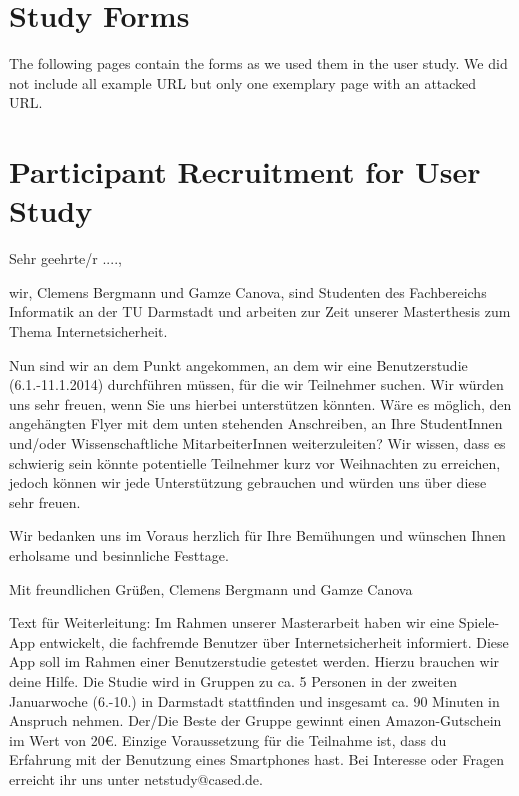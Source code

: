 \section{Study Forms}
The following pages contain the forms as we used them in the user study. We did not include all example URL but only one exemplary page with an attacked URL.
\label{s:before_survey}

\label{s:url_survey}

\label{s:after_survey}


\section{Participant Recruitment for User Study}
\label{s:participant_recruitment}

Sehr geehrte/r ....,

wir, Clemens Bergmann und Gamze Canova, sind Studenten des Fachbereichs Informatik an der TU Darmstadt und arbeiten zur Zeit unserer Masterthesis zum Thema Internetsicherheit.

Nun sind wir an dem Punkt angekommen, an dem wir eine Benutzerstudie (6.1.-11.1.2014) durchführen müssen, für die wir Teilnehmer suchen. Wir würden uns sehr freuen, wenn Sie uns hierbei unterstützen könnten. Wäre es möglich, den angehängten Flyer mit dem unten stehenden Anschreiben, an Ihre StudentInnen und/oder Wissenschaftliche MitarbeiterInnen  weiterzuleiten? Wir wissen, dass es schwierig sein könnte potentielle Teilnehmer kurz vor Weihnachten zu erreichen, jedoch können wir jede Unterstützung gebrauchen und würden uns über diese sehr freuen.

Wir bedanken uns im Voraus herzlich für Ihre Bemühungen und wünschen Ihnen erholsame und besinnliche Festtage.

Mit freundlichen Grüßen, 
Clemens Bergmann und Gamze Canova

Text für Weiterleitung:
Im Rahmen unserer Masterarbeit haben wir eine Spiele-App entwickelt, die fachfremde Benutzer über Internetsicherheit informiert.  Diese App soll im Rahmen einer Benutzerstudie getestet werden. Hierzu brauchen wir deine Hilfe. Die Studie wird in Gruppen zu ca. 5 Personen in der zweiten Januarwoche (6.-10.) in Darmstadt stattfinden und insgesamt ca. 90 Minuten in Anspruch nehmen.  Der/Die Beste der Gruppe gewinnt einen Amazon-Gutschein im Wert von 20€.  Einzige Voraussetzung für die Teilnahme ist, dass du Erfahrung mit der Benutzung eines Smartphones hast. Bei Interesse oder Fragen erreicht ihr uns unter netstudy@cased.de. 


